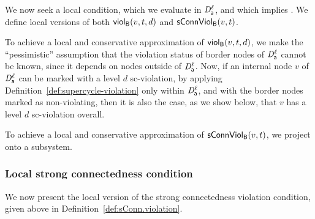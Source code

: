 
We now seek a local condition, which we evaluate in $\dsk{\act}{\l}$, and which implies \GAO.
We define local versions of both $\scViol{v}{d}{t}$ and $\connViol{v}{t}$.

To achieve a local and conservative approximation of $\scViol{v}{d}{t}$, we make the ``pessimistic'' assumption that the violation status of border
nodes of $\dsk{\act}{\l}$ cannot be known, since it depends on nodes outside of $\dsk{\act}{\l}$.
Now, if an internal node $v$ of $\dsk{\act}{\l}$ can be marked with a level $d$ sc-violation, by applying 
Definition~\ref{def:supercycle-violation} only within
$\dsk{\act}{\l}$, and with the border nodes marked as non-violating,
then it is also the case, as we show below, that $v$ has a level $d$ sc-violation overall.

To achieve a local and conservative approximation of
$\connViol{v}{t}$, we project onto a subsystem.


\subsubsection{Local strong connectedness condition}

We now present the local version of the strong connectedness violation condition, given above in Definition~\ref{def:sConn.violation}.

